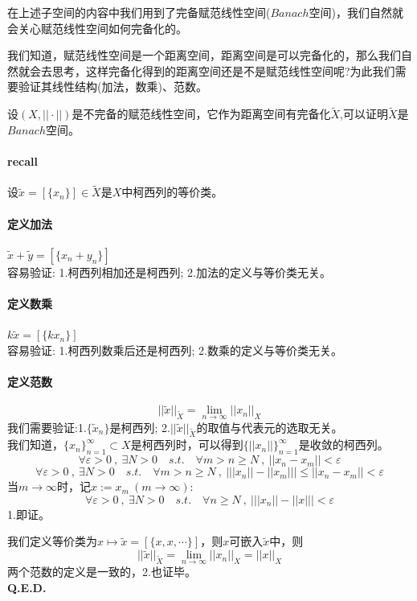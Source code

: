在上述子空间的内容中我们用到了完备赋范线性空间($Banach$空间)，我们自然就会关心赋范线性空间如何完备化的。

我们知道，赋范线性空间是一个距离空间，距离空间是可以完备化的，那么我们自然就会去思考，这样完备化得到的距离空间还是不是赋范线性空间呢?为此我们需要验证其线性结构(加法，数乘)、范数。
\begin{theorem}
    设$(X,||\cdot||)$是不完备的赋范线性空间，它作为距离空间有完备化$\tilde{X}$,可以证明$\tilde{X}$是$Banach$空间。
\end{theorem}
\paragraph*{recall} \quad 设$\tilde{x}=[\{x_n\}] \in \tilde{X}$是$X$中柯西列的等价类。
\paragraph*{定义加法} \quad $\tilde{x}+\tilde{y}=[\{x_n+y_n\}]$\\
容易验证: 1.柯西列相加还是柯西列; 2.加法的定义与等价类无关。
\paragraph*{定义数乘} \quad $k\tilde{x}=[\{kx_n\}]$\\
容易验证: 1.柯西列数乘后还是柯西列; 2.数乘的定义与等价类无关。
\paragraph*{定义范数}
\[||\tilde{x}||_{\tilde{X}}=\lim_{n \to \infty}||x_n||_X\]
我们需要验证:1.$\{\tilde{x}_n\}$是柯西列; 2.$||\tilde{x}||_{\tilde{X}}$的取值与代表元的选取无关。\\
我们知道，$\{x_n\}_{n=1}^{\infty} \subset X$是柯西列时，可以得到$\{||x_n||\}_{n=1}^{\infty}$是收敛的柯西列。
\[\forall \varepsilon>0 \ , \ \exists N>0 \quad s.t. \quad \forall m>n \geq N \ , \ ||x_n-x_m||<\varepsilon\]
\[\forall \varepsilon>0 \ , \ \exists N>0 \quad s.t. \quad \forall m>n \geq N \ , \ \left|||x_n||-||x_m||\right| \leq ||x_n-x_m||<\varepsilon\]
当$m \to \infty$时，记$x:=x_m \ (m \to \infty)$:
\[\forall \varepsilon>0 \ , \ \exists N>0 \quad s.t. \quad \forall n \geq N \ , \ \left|||x_n||-||x||\right|<\varepsilon\]
1.即证。

我们定义等价类为$x \mapsto \tilde{x}=[\{x,x,\cdots\}]$，则$x$可嵌入$\tilde{x}$中，则
\[||\tilde{x}||_{\tilde{X}}=\lim_{n \to \infty}||x_n||_X=||x||_X\]
两个范数的定义是一致的，2.也证毕。\\
\textbf{Q.E.D.}

